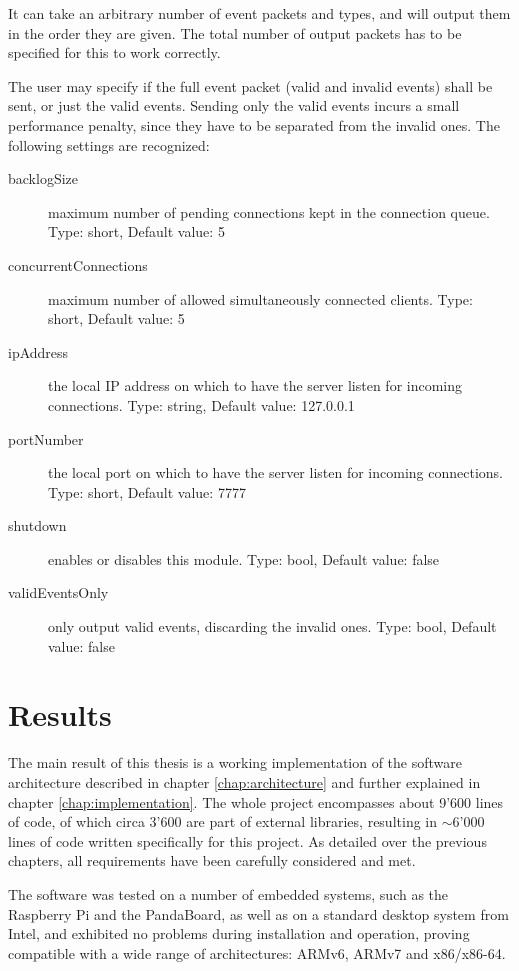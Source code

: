\documentclass[a4paper,12pt]{report}
\begin{document}
It can take an arbitrary number of event packets and types, and will output them in the order they are given. The total number of output packets has to be specified for this to work correctly.

The user may specify if the full event packet (valid and invalid events) shall be sent, or just the valid events. Sending only the valid events incurs a small performance penalty, since they have to be separated from the invalid ones.
\clearpage
The following settings are recognized:
\begin{description}
\item[backlogSize] maximum number of pending connections kept in the connection queue.
\subitem Type: short, Default value: 5
\item[concurrentConnections] maximum number of allowed simultaneously connected clients.
\subitem Type: short, Default value: 5
\item[ipAddress] the local IP address on which to have the server listen for incoming connections.
\subitem Type: string, Default value: 127.0.0.1
\item[portNumber] the local port on which to have the server listen for incoming connections.
\subitem Type: short, Default value: 7777
\item[shutdown] enables or disables this module.
\subitem Type: bool, Default value: false
\item[validEventsOnly] only output valid events, discarding the invalid ones.
\subitem Type: bool, Default value: false
\end{description}

\chapter{Results} \label{chap:results}

The main result of this thesis is a working implementation of the software architecture described in chapter \ref{chap:architecture} and further explained in chapter \ref{chap:implementation}.
The whole project encompasses about 9'600 lines of code, of which circa 3'600 are part of external libraries, resulting in $\sim$6'000 lines of code written specifically for this project.
As detailed over the previous chapters, all requirements have been carefully considered and met.

The software was tested on a number of embedded systems, such as the Raspberry Pi and the PandaBoard, as well as on a standard desktop system from Intel, and exhibited no problems during installation and operation, proving compatible with a wide range of architectures: ARMv6, ARMv7 and x86/x86-64.
\end{document}
